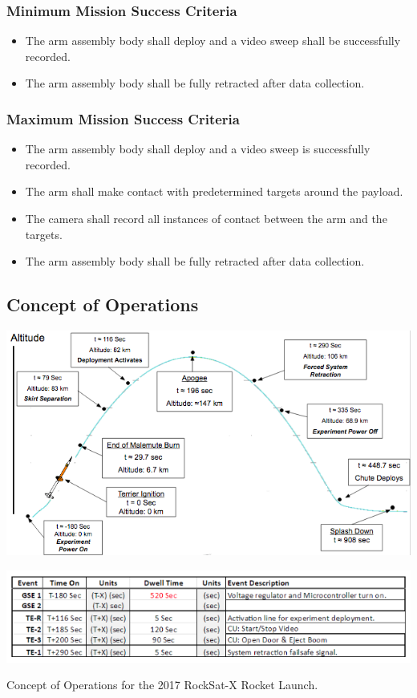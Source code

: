 \documentclass[letterpaper,10pt]{article}
\begin{document}
\subsubsection{Minimum Mission Success Criteria}
\begin{itemize}
\item{The arm assembly body shall deploy and a video sweep shall be successfully recorded.}
\item{The arm assembly body shall be fully retracted after data collection.}
\end{itemize}

\subsubsection{Maximum Mission Success Criteria}
\begin{itemize}
\item{The arm assembly body shall deploy and a video sweep is successfully recorded.}
\item{The arm shall make contact with predetermined targets around the payload.}
\item{The camera shall record all instances of contact between the arm and the targets.}
\item{The arm assembly body shall be fully retracted after data collection.}
\end{itemize}


\subsection{Concept of Operations}
\includegraphics[width=\textwidth]{./images/conops}

\includegraphics[width=\textwidth]{./images/conopsTable}
\begin{center}
	Concept of Operations for the 2017 RockSat-X Rocket Launch.
\end{center}
\end{document}
